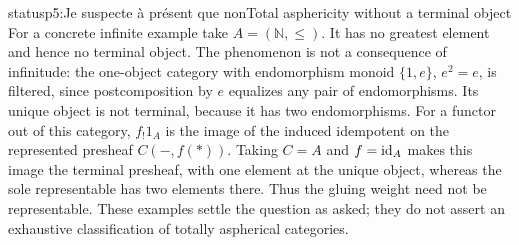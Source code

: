 \begin{dcomment}{status}{p5:Je suspecte à présent que non}{Total asphericity without a terminal object}
For a concrete infinite example take \(A=(\mathbb N,\leq)\). It has no greatest element and hence no terminal object. The phenomenon is not a consequence of infinitude: the one-object category with endomorphism monoid \(\{1,e\}\), \(e^2=e\), is filtered, since postcomposition by \(e\) equalizes any pair of endomorphisms. Its unique object is not terminal, because it has two endomorphisms. For a functor out of this category, \(f_!1_A\) is the image of the induced idempotent on the represented presheaf \(C(-,f(*))\). Taking \(C=A\) and \(f=\mathrm{id}_A\) makes this image the terminal presheaf, with one element at the unique object, whereas the sole representable has two elements there. Thus the gluing weight need not be representable. These examples settle the question as asked; they do not assert an exhaustive classification of totally aspherical categories.
\end{dcomment}


